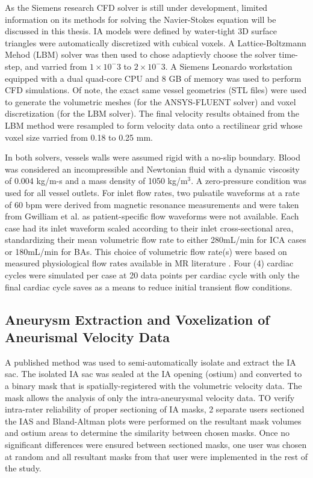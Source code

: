 As the Siemens research CFD solver is still under development, limited information on its methods for solving the Navier-Stokes equation will be discussed in this thesis. IA models were defined by water-tight 3D surface triangles were automatically discretized with cubical voxels. A Lattice-Boltzmann Mehod (LBM) solver was then used to chose adaptievly choose the solver time-step, and varried from $1\times 10^-3$ to $2\times 10^-3$. A Siemens Leonardo workstation equipped with a dual quad-core CPU and 8 GB of memory was used to perform CFD simulations. Of note, the exact same vessel geometries (STL files) were used to generate the volumetric meshes (for the ANSYS-FLUENT solver) and voxel discretization (for the LBM solver). The final velocity results obtained from the LBM method were resampled to form velocity data onto a rectilinear grid whose voxel size varried from 0.18 to 0.25 mm.

In both solvers, vessels walls were assumed rigid with a no-slip boundary. Blood was considered an incompressible and Newtonian fluid with a dynamic viscosity of 0.004 kg/m-s and a mass density of 1050 kg/m$^3$. A zero-pressure condition was used for all vessel outlets. For inlet flow rates, two pulsatile waveforms at a rate of 60 bpm were derived from magnetic resonance measurements and were taken from Gwilliam et al. \cite{gwilliam2009mr} as patient-specific flow waveforms were not available. Each case had its inlet waveform scaled according to their inlet cross-sectional area, standardizing their mean volumetric flow rate to either 280mL/min for ICA cases or 180mL/min for BAs. This choice of volumetric flow rate(s) were based on measured physiological flow rates available in MR literature \cite{enzmann1994blood,zhao2007regional}. Four (4) cardiac cycles were simulated per case at 20 data points per cardiac cycle with only the final cardiac cycle saves as a means to reduce initial transient flow conditions.  

\subsection{Aneurysm Extraction and Voxelization of Aneurismal Velocity Data}
A published method \cite{jiang2013interactive} was used to semi-automatically isolate and extract the IA sac. The isolated IA sac was sealed at the IA opening (ostium) and converted to a binary mask that is spatially-registered with the volumetric velocity data. The mask allows the analysis of only the intra-aneurysmal velocity data. TO verify intra-rater reliability of proper sectioning of IA masks, 2 separate users sectioned the IAS and Bland-Altman plots were performed on the resultant mask volumes and ostium areas to determine the similarity between chosen masks. Once no significant differences were ensured between sectioned masks, one user was chosen at random and all resultant masks from that user were implemented in the rest of the study. 


